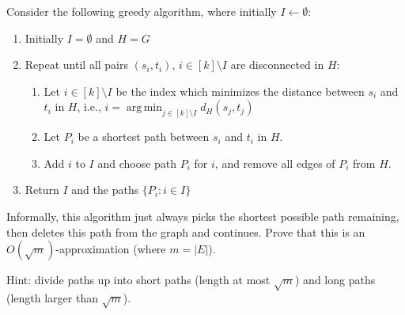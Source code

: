\documentclass[11pt]{article}
\DeclareMathOperator*{\argmin}{arg\,min}
\begin{document}
Consider the following greedy algorithm, where initially $I \leftarrow \emptyset$:
\begin{enumerate}[label=\arabic*.]
\item Initially $I = \emptyset$ and $H = G$
\item Repeat until all pairs $(s_i, t_i)$, $i \in [k] \setminus I$ are disconnected in $H$:
	\begin{enumerate}
	\item Let $i \in [k] \setminus I$ be the index which minimizes the distance between $s_i$ and $t_i$ in $H$, i.e., $i = \argmin_{j \in [k] \setminus I} d_H(s_j, t_j)$
	\item Let $P_{i}$ be a shortest path between $s_i$ and $t_i$ in $H$.
	\item Add $i$ to $I$ and choose path $P_{i}$ for $i$, and remove all edges of $P_{i}$ from $H$.
	\end{enumerate}
\item Return $I$ and the paths $\{P_i : i \in I\}$
\end{enumerate}

Informally, this algorithm just always picks the shortest possible path remaining, then deletes this path from the graph and continues.  Prove that this is an $O(\sqrt{m})$-approximation (where $m = |E|$).  

Hint: divide paths up into short paths (length at most $\sqrt{m}$) and long paths (length larger than $\sqrt{m}$).  
\end{document}
